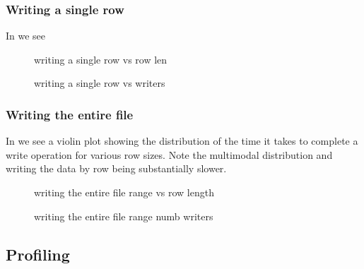 \subsubsection{Writing a single row}
In  we see 

\begin{figure}[htbp]
	\centering
	
	\caption{writing a single row vs row len}
	\label{fig:single_rowlen}
\end{figure}%

\begin{figure}[htbp]
	\centering
	
	\caption{writing a single row vs writers}
	\label{fig:single_writers}
\end{figure}

\subsubsection{Writing the entire file}
In  we see a violin plot showing the distribution of the time it takes to complete a write operation for various row sizes. Note the multimodal distribution and writing the data by row being substantially slower.

\begin{figure}[htbp]
	\centering
	
	\caption{writing the entire file range vs row length}
	\label{fig:rowlen}
\end{figure}%

\begin{figure}[htbp]
	\centering
	
	\caption{writing the entire file range numb writers}
	\label{fig:writers}
\end{figure}

\subsection{Profiling} \label{sec:profile}
